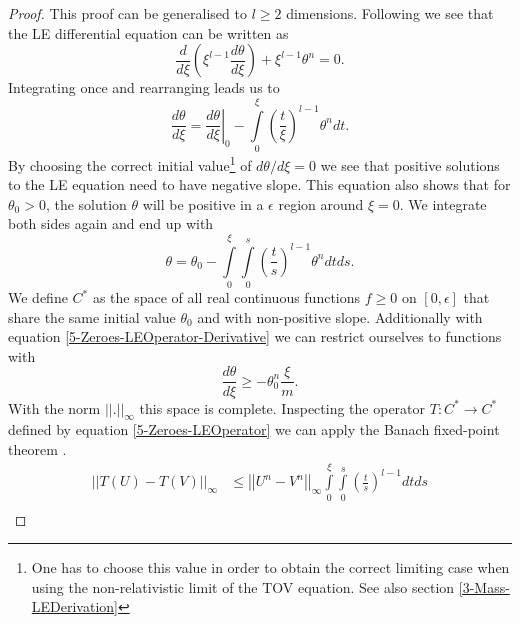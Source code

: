 \begin{proof}
	This proof can be generalised to $l\geq2$ dimensions. 
	Following \cite{quittnerSuperlinearParabolicProblems2007a} we see that the LE differential equation can be written as
	\begin{equation}
		\frac{d}{d\xi}\left(\xi^{l-1}\frac{d\theta}{d\xi}\right) + \xi^{l-1}\theta^n = 0.
	\end{equation}
	Integrating once and rearranging leads us to
	\begin{equation}
		\frac{d\theta}{d\xi} = \left.\frac{d\theta}{d\xi}\right|_0 - \int\limits_0^\xi\left(\frac{t}{\xi}\right)^{l-1}\theta^ndt.
		\label{5-Zeroes-LEOperator-Derivative}
	\end{equation}
	By choosing the correct initial value\footnote{One has to choose this value in order to obtain the correct limiting case when using the non-relativistic limit of the \ac{TOV} equation. See also section \ref{3-Mass-LEDerivation}} of $d\theta/d\xi=0$ we see that positive solutions to the LE equation need to have negative slope.
	This equation also shows that for $\theta_0>0$, the solution $\theta$ will be positive in a $\epsilon$ region around $\xi=0$.
	We integrate both sides again and end up with
	\begin{equation}
		\theta = \theta_0 - \int\limits_0^\xi\int\limits_0^s\left(\frac{t}{s}\right)^{l-1}\theta^ndtds.
		\label{5-Zeroes-LEOperator}
	\end{equation}
	We define $C^*$ as the space of all real continuous functions $f\geq0$ on $[0,\epsilon]$ that share the same initial value $\theta_0$ and with non-positive slope. %
	Additionally with equation \eqref{5-Zeroes-LEOperator-Derivative} we can restrict ourselves to functions with
	\begin{equation}
		\frac{d\theta}{d\xi} \geq -\theta_0^n\frac{\xi}{m}.
		\label{5-Zeroes-LEOperator-Restrict-Slope}
	\end{equation}
	With the norm $||.||_\infty$ this space is complete.
	Inspecting the operator $T:C^*\rightarrow C^*$ defined by
	equation \ref{5-Zeroes-LEOperator} we can apply the Banach fixed-point theorem \cite{banachOperationsDansEnsembles1922}.
	\begin{align}
		||T(U)-T(V)||_\infty	&\leq	\left|\left|U^n-V^n\right|\right|_\infty\int\limits_0^\xi\int\limits_0^s \left(\frac{t}{s}\right)^{l-1}dtds\\

\end{align}
\end{proof}
